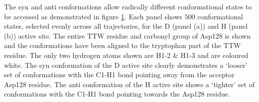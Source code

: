 The syn and anti conformations allow radically different conformational states to be accessed as demonstrated in figure \ref{fig:ttw_wiggle}. Each panel shows $500$ conformational states, selected evenly across all trajectories, for the D (panel (a)) and H (panel (b)) active site. The entire TTW residue and carbonyl group of Asp128 is shown and the conformations have been aligned to the tryptophan part of the TTW residue. The only two hydrogen atoms shown are H1-2 \& H1-3 and are coloured white. The syn conformation of the D active site clearly demonstrates a `looser' set of conformations with the  C1-H1 bond pointing away from the acceptor Asp128 residue. The anti conformation of the H active site shows a `tighter' set of conformations with the C1-H1 bond pointing towards the Asp128 residue. 


\begin{figure}
    \centering
    \label{fig:ttw_wiggle}
\end{figure}

